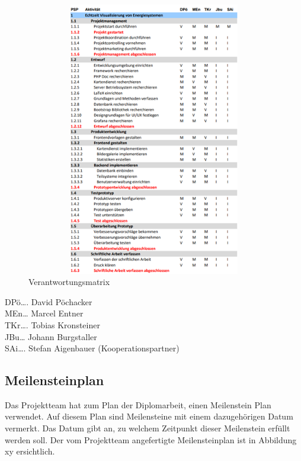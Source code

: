 \begin{figure}[h]
	\centering
	\includegraphics[height=12cm,width=12cm]{images/Verantwortungsmatrix}
	\caption{Verantwortungsmatrix}
	\label{fig:Verantwortungsmatrix }
\end{figure}
 DPö…. David Pöchacker \\
 MEn… Marcel Entner \\
 TKr…. Tobias Kronsteiner \\
 JBu… Johann Burgstaller \\
 SAi…. Stefan Aigenbauer (Kooperationspartner) \\

\newpage
\subsection{Meilensteinplan}
Das Projektteam hat zum Plan der Diplomarbeit, einen Meilenstein Plan verwendet. Auf diesem Plan sind Meilensteine mit einem dazugehörigen Datum vermerkt. Das Datum gibt an, zu welchem Zeitpunkt dieser Meilenstein erfüllt werden soll. Der vom Projektteam angefertigte Meilensteinplan ist in Abbildung xy ersichtlich.

